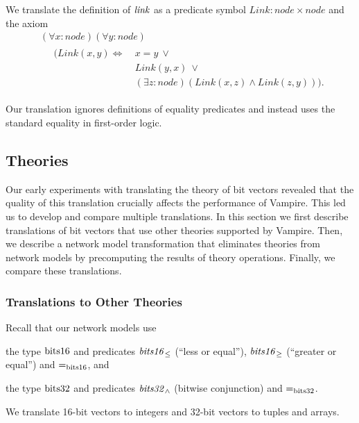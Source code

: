 We translate the definition of $\mathit{link}$ as a predicate symbol $\mathit{Link}: \mathit{node} \times \mathit{node}$ and the axiom
\begin{equation*}
\begin{aligned}
&(\forall x:\mathit{node})(\forall y:\mathit{node})\\
&\quad
 \begin{aligned}
  (\mathit{Link}(x,y)\Leftrightarrow\:&x=y\:\vee\:\\
                                      &Link(y,x)\:\vee\:\\
                                      &(\exists z:\mathit{node})(\mathit{Link}(x,z)\wedge\mathit{Link}(z,y))).
 \end{aligned}
\end{aligned}
\end{equation*}

Our translation ignores definitions of equality predicates and instead uses the standard equality in first-order logic. %

\subsection{Theories}
\label{sect:aws/fol/theories}
Our early experiments with translating the theory of bit vectors revealed that the quality of this translation crucially affects the performance of Vampire. This led us to develop and compare multiple translations. In this section we first describe translations of bit vectors that use other theories supported by Vampire. Then, we describe a network model transformation that eliminates theories from network models by precomputing the results of theory operations. Finally, we compare these translations.

\subsubsection*{Translations to Other Theories}
Recall that our network models use
\begin{enumerate*}[label=(\roman*)]
  \item the type $\mathrm{bits16}$ and predicates $\mathit{bits16}_{\le}$ (``less or equal''), $\mathit{bits16}_{\ge}$ (``greater or equal'') and $\mathit{=}_{\mathrm{bits16}}$, and
  \item the type $\mathrm{bits32}$ and predicates $\mathit{bits32}_\wedge$ (bitwise conjunction) and $\mathit{=}_{\mathrm{bits32}}$.
\end{enumerate*}
We translate 16-bit vectors to integers and 32-bit vectors to tuples and arrays.

